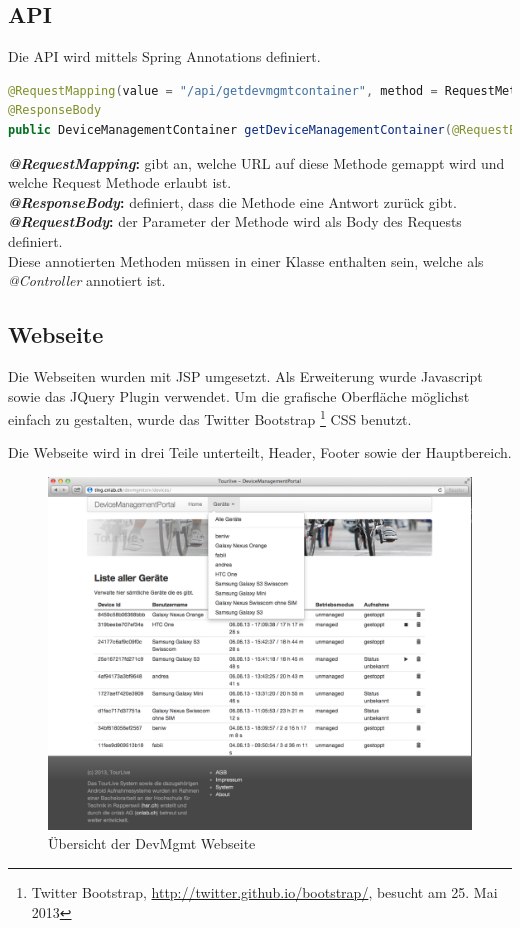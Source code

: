 \subsection{API}
Die API wird mittels Spring Annotations definiert. 

\begin{lstlisting}[language=Java, caption=Spring Annotation]
@RequestMapping(value = "/api/getdevmgmtcontainer", method = RequestMethod.POST)
@ResponseBody
public DeviceManagementContainer getDeviceManagementContainer(@RequestBody final StatusData request)

\end{lstlisting}
\textbf{\textit{@RequestMapping}:} gibt an, welche URL auf diese Methode gemappt wird und welche Request Methode erlaubt ist.\\
\textbf{\textit{@ResponseBody}: } definiert, dass die Methode eine Antwort zurück gibt.\\
\textbf{\textit{@RequestBody}: } der Parameter der Methode wird als Body des Requests definiert.\\
Diese annotierten Methoden müssen in einer Klasse enthalten sein, welche als \textit{@Controller} annotiert ist.


\subsection{Webseite}
Die Webseiten wurden mit JSP umgesetzt. Als Erweiterung wurde Javascript sowie das JQuery Plugin verwendet. Um die grafische Oberfläche möglichst einfach zu gestalten, wurde das Twitter Bootstrap \footnote{Twitter Bootstrap, \url{http://twitter.github.io/bootstrap/}, besucht am 25. Mai 2013} CSS benutzt.

Die Webseite wird in drei Teile unterteilt, Header, Footer sowie der Hauptbereich. 

\begin{figure}[H]
	\centering
	\includegraphics[width=120mm]{images/devmgmtsrv/all.png}
	\caption{Übersicht der DevMgmt Webseite}
\end{figure}

